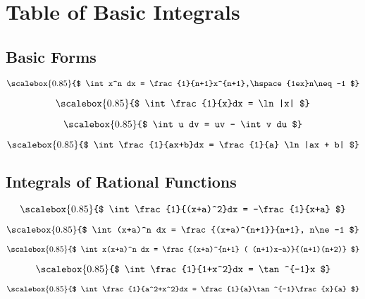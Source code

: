
\chapter{Table of Basic Integrals}

\newcommand*{\Scale}[2][4]{\scalebox{#1}{$#2$}}%



\section*{Basic Forms}

\begin{equation}\Scale[0.85]{
\int x^n dx = \frac{1}{n+1}x^{n+1},\hspace{1ex}n\neq -1
}\end{equation}

\begin{equation}\Scale[0.85]{
\int \frac{1}{x}dx = \ln |x|
}\end{equation}

\begin{equation}\Scale[0.85]{
\int u dv = uv - \int v du
}\end{equation}

\begin{equation}\Scale[0.85]{
\int \frac{1}{ax+b}dx = \frac{1}{a} \ln |ax + b| 
}\end{equation}

\section* {Integrals of Rational Functions}

\begin{equation}\Scale[0.85]{
\int \frac{1}{(x+a)^2}dx = -\frac{1}{x+a}
}\end{equation}

\begin{equation}\Scale[0.85]{
\int (x+a)^n dx = \frac{(x+a)^{n+1}}{n+1}, n\ne -1
}\end{equation}

\begin{equation}\Scale[0.85]{
\int x(x+a)^n dx = \frac{(x+a)^{n+1} ( (n+1)x-a)}{(n+1)(n+2)}
}\end{equation}

\begin{equation}\Scale[0.85]{
\int \frac{1}{1+x^2}dx = \tan^{-1}x
}\end{equation}

\begin{equation}\Scale[0.85]{
\int \frac{1}{a^2+x^2}dx = \frac{1}{a}\tan^{-1}\frac{x}{a}
}\end{equation}

